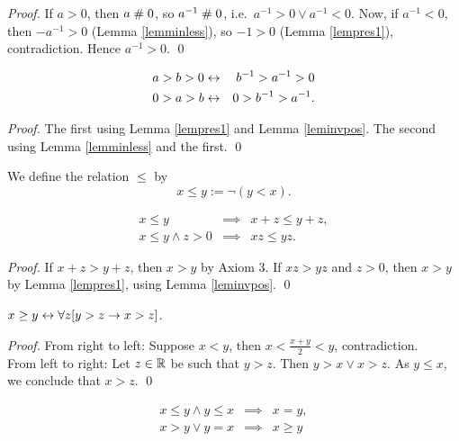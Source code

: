 \begin{proof}
 If $a> 0$, then $a\mathrel{\#} 0$, so $a^{-1} \mathrel{\#} 0$, i.e.\ $a^{-1}>0 \vee
 a^{-1}< 0$. Now, if $a^{-1}< 0$, then $-a^{-1}>0$ (Lemma
 \ref{lemminless}), so $-1 >0$ (Lemma \ref{lempres1}),
 contradiction. Hence $a^{-1}>0$. \qed
\end{proof}

\begin{lemma}\label{leminvless}
\begin{eqnarray*}
a>b>0 &\leftrightarrow& b^{-1} > a^{-1} > 0\\
0>a>b &\leftrightarrow& 0> b^{-1} > a^{-1}.
\end{eqnarray*}
\end{lemma}

\begin{proof}
The first using Lemma \ref{lempres1} and Lemma \ref{leminvpos}. The
second using Lemma \ref{lemminless} and the first. \qed
\end{proof}


\begin{definition}\label{defleq}
We define the relation $\leq$ by
$$x\leq y := \neg(y< x).$$
\end{definition}

\begin{lemma}\label{lemmulpresgeq}
\begin{eqnarray*}
x\leq y &\implies& x+z \leq y+z,\\
x\leq y \wedge z>0 &\implies& x z \leq y z.
\end{eqnarray*}
\end{lemma}

\begin{proof} If $x+z > y +z$, then $x>y$ by Axiom 3.
If $x z > y  z$ and $z>0$, then $x>y$ by Lemma \ref{lempres1}, using Lemma
\ref{leminvpos}. \qed 
\end{proof}

\begin{lemma}\label{lemgtgeq}
$x\geq y \leftrightarrow \forall z[y>z \rightarrow x>z]$.
\end{lemma}

\begin{proof}
From right to left: Suppose $x<y$, then $x< \frac{x+y}{2} < y$,
contradiction.\\
From left to right: Let $z\in\mathbb{R}$ be such that $y>z$. Then $y>x\vee
x>z$. As $y\leq x$, we conclude that $x>z$. 
\qed
\end{proof}

\begin{lemma}\label{lemgeqprop}
\begin{eqnarray*}
x\leq y \wedge y\leq x &\implies& x=y,\\
x> y \vee y=x &\implies& x\geq y
\end{eqnarray*}
\end{lemma}

